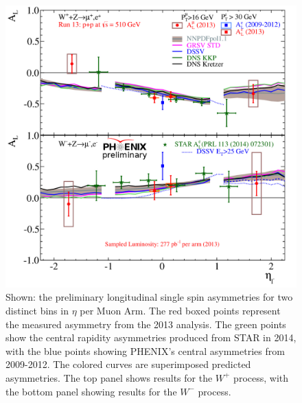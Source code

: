 \begin{figure}[ht]
  \centering
  \includegraphics[width=0.8\linewidth]{./figures/prelim_AL_2bins.jpg}
  \caption{
    Shown: the preliminary longitudinal single spin asymmetries for two distinct
    bins in $\eta$ per Muon Arm. The red boxed points represent the measured
    asymmetry from the 2013 analysis. The green points show the central rapidity
    asymmetries produced from STAR in 2014, with the blue points showing
    PHENIX's central asymmetries from 2009-2012. The colored curves are
    superimposed predicted asymmetries. The top panel shows results for the
    $W^+$ process, with the bottom panel showing results for the $W^-$ process.
  }
  \label{fig:al_preliminary_standard}
\end{figure}
